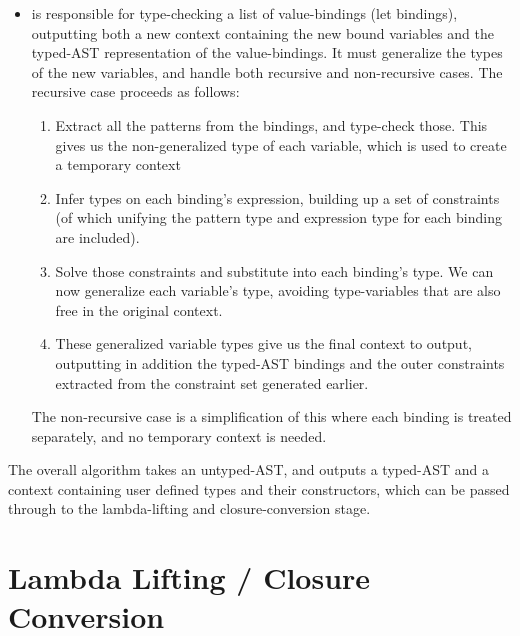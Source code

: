 \begin{itemize}
\item {} is responsible for type-checking a list of value-bindings (let bindings), outputting both a new context containing the new bound variables and the typed-AST representation of the value-bindings. It must generalize the types of the new variables, and handle both recursive and non-recursive cases. The recursive case proceeds as follows:
\begin{enumerate}
\item Extract all the patterns from the bindings, and type-check those. This gives us the non-generalized type of each variable, which is used to create a temporary context
\item Infer types on each binding's expression, building up a set of constraints (of which unifying the pattern type and expression type for each binding are included).
\item Solve those constraints and substitute into each binding's type. We can now generalize each variable's type, avoiding type-variables that are also free in the original context.
\item These generalized variable types give us the final context to output, outputting in addition the typed-AST bindings and the outer constraints extracted from the constraint set generated earlier.
\end{enumerate}
The non-recursive case is a simplification of this where each binding is treated separately, and no temporary context is needed.
\end{itemize}
\noindent
The overall algorithm takes an untyped-AST, and outputs a typed-AST and a context containing user defined types and their constructors, which can be passed through to the lambda-lifting and closure-conversion stage.

\section{Lambda Lifting / Closure Conversion}

